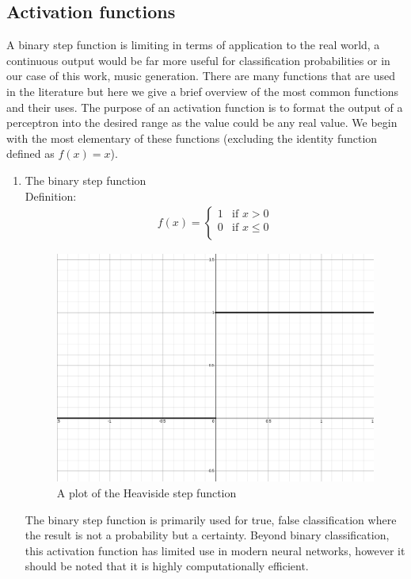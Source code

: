 \documentclass{article}
\begin{document}
\subsection{Activation functions}
\label{sec:activationfuncs}
A binary step function is limiting in terms of application to the real world, a continuous output would be far more useful for classification probabilities or in our case of this work, music generation. There are many functions that are used in the literature but here we give a brief overview of the most common functions and their uses. The purpose of an activation function is to format the output of a perceptron into the desired range as the value could be any real value. We begin with the most elementary of these functions (excluding the identity function defined as $f(x) = x$). 
\begin{enumerate}
\item The binary step function \\
Definition:
\begin{align*}
f(x) = 
\begin{cases}
 1 & \text{if } x > 0 \\
 0 & \text{if } x \leq 0 \\
\end{cases}
\end{align*}
\begin{figure}[H]
\centering
\caption{A plot of the Heaviside step function}
\includegraphics[scale=0.2]{heaviside.png}
\end{figure}
The binary step function is primarily used for true, false classification where the result is not a probability but a certainty. Beyond binary classification, this activation function has limited use in modern neural networks, however it should be noted that it is highly computationally efficient. 

\end{enumerate}
\end{document}
